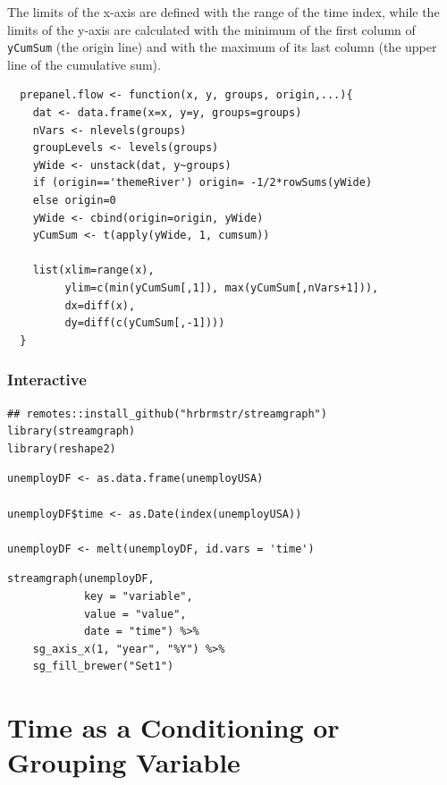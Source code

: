 \documentclass[smallroyalvopaper]{memoir}
\begin{document}
The limits of the x-axis are defined with the range of the time index,
while the limits of the y-axis are calculated with the minimum of the
first column of \texttt{yCumSum} (the origin line) and with the maximum of
its last column (the upper line of the cumulative sum).

\lstset{language=r,label= ,caption= ,captionpos=b,numbers=none}
\begin{lstlisting}
  prepanel.flow <- function(x, y, groups, origin,...){
    dat <- data.frame(x=x, y=y, groups=groups)
    nVars <- nlevels(groups)
    groupLevels <- levels(groups)
    yWide <- unstack(dat, y~groups)
    if (origin=='themeRiver') origin= -1/2*rowSums(yWide)
    else origin=0
    yWide <- cbind(origin=origin, yWide)
    yCumSum <- t(apply(yWide, 1, cumsum))
  
    list(xlim=range(x),
         ylim=c(min(yCumSum[,1]), max(yCumSum[,nVars+1])),
         dx=diff(x),
         dy=diff(c(yCumSum[,-1])))
  }
\end{lstlisting}

\subsection{Interactive \label{sec:interactive}}
\label{sec:orgff344f4}

\lstset{language=r,label= ,caption= ,captionpos=b,numbers=none}
\begin{lstlisting}
## remotes::install_github("hrbrmstr/streamgraph")
library(streamgraph)
library(reshape2)
\end{lstlisting}

\lstset{language=r,label= ,caption= ,captionpos=b,numbers=none}
\begin{lstlisting}
unemployDF <- as.data.frame(unemployUSA)

unemployDF$time <- as.Date(index(unemployUSA))

unemployDF <- melt(unemployDF, id.vars = 'time')
\end{lstlisting}

\lstset{language=r,label= ,caption= ,captionpos=b,numbers=none}
\begin{lstlisting}
streamgraph(unemployDF,
            key = "variable",
            value = "value",
            date = "time") %>%
    sg_axis_x(1, "year", "%Y") %>%
    sg_fill_brewer("Set1")
\end{lstlisting}

\chapter{Time as a Conditioning or Grouping Variable}
\label{sec:org3cfca76}
\label{cha:timeGroupFactor}
\end{document}
